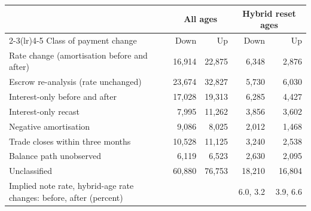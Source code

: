 \begin{tabular}{lrrrr}
\toprule
 & \multicolumn{2}{c}{All ages} & \multicolumn{2}{c}{Hybrid reset ages} \\
\cmidrule(lr){2-3}\cmidrule(lr){4-5}
Class of payment change & Down & Up & Down & Up \\
\midrule
Rate change (amortisation before and after) & 16,914 & 22,875 & 6,348 & 2,876 \\
Escrow re-analysis (rate unchanged) & 23,674 & 32,827 & 5,730 & 6,030 \\
Interest-only before and after & 17,028 & 19,313 & 6,285 & 4,427 \\
Interest-only recast & 7,995 & 11,262 & 3,856 & 3,602 \\
Negative amortisation & 9,086 & 8,025 & 2,012 & 1,468 \\
Trade closes within three months & 10,528 & 11,125 & 3,240 & 2,538 \\
Balance path unobserved & 6,119 & 6,523 & 2,630 & 2,095 \\
Unclassified & 60,880 & 76,753 & 18,210 & 16,804 \\
\midrule
Implied note rate, hybrid-age rate changes: before, after (percent) & & & 6.0, 3.2 & 3.9, 6.6 \\
\bottomrule
\end{tabular}
